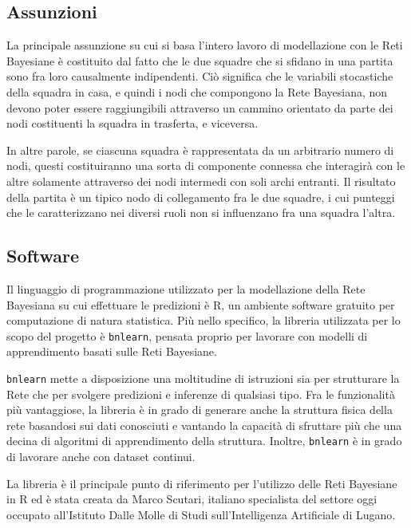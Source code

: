 \documentclass[hidelinks, 12pt]{article}
\begin{document}
\subsection{Assunzioni}
\label{sec:bn-assumptions}

La principale assunzione su cui si basa l'intero lavoro di modellazione con le Reti Bayesiane è costituito dal fatto che le due squadre che si sfidano in una partita sono fra loro causalmente indipendenti. Ciò significa che le variabili stocastiche della squadra in casa, e quindi i nodi che compongono la Rete Bayesiana, non devono poter essere raggiungibili attraverso un cammino orientato da parte dei nodi costituenti la squadra in trasferta, e viceversa.

In altre parole, se ciascuna squadra è rappresentata da un arbitrario numero di nodi, questi costituiranno una sorta di componente connessa che interagirà con le altre solamente attraverso dei nodi intermedi con soli archi entranti. Il risultato della partita è un tipico nodo di collegamento fra le due squadre, i cui punteggi che le caratterizzano nei diversi ruoli non si influenzano fra una squadra l'altra.



\subsection{Software}

Il linguaggio di programmazione utilizzato per la modellazione della Rete Bayesiana su cui effettuare le predizioni è R\cite{site:r}, un ambiente software gratuito per computazione di natura statistica. Più nello specifico, la libreria utilizzata per lo scopo del progetto è \texttt{bnlearn}\cite{site:bnlearn}, pensata proprio per lavorare con modelli di apprendimento basati sulle Reti Bayesiane.

\texttt{bnlearn} mette a disposizione una moltitudine di istruzioni sia per strutturare la Rete che per svolgere predizioni e inferenze di qualsiasi tipo. Fra le funzionalità più vantaggiose, la libreria è in grado di generare anche la struttura fisica della rete basandosi sui dati conosciuti e vantando la capacità di sfruttare più che una decina di algoritmi di apprendimento della struttura. Inoltre, \texttt{bnlearn} è in grado di lavorare anche con dataset continui. 

La libreria è il principale punto di riferimento per l'utilizzo delle Reti Bayesiane in R ed è stata creata da Marco Scutari, italiano specialista del settore oggi occupato all'Istituto Dalle Molle di Studi sull'Intelligenza Artificiale di Lugano.
\end{document}
